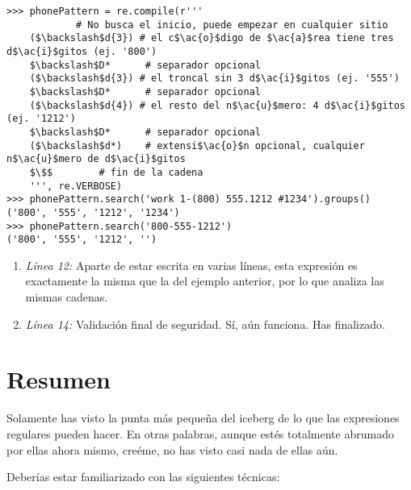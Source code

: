 \noindent\begin{minipage}{\textwidth}
\begin{lstlisting}[mathescape=True]
>>> phonePattern = re.compile(r'''
            # No busca el inicio, puede empezar en cualquier sitio
    ($\backslash$d{3}) # el c$\ac{o}$digo de $\ac{a}$rea tiene tres d$\ac{i}$gitos (ej. '800')
    $\backslash$D*      # separador opcional
    ($\backslash$d{3}) # el troncal sin 3 d$\ac{i}$gitos (ej. '555')
    $\backslash$D*      # separador opcional
    ($\backslash$d{4}) # el resto del n$\ac{u}$mero: 4 d$\ac{i}$gitos (ej. '1212')
    $\backslash$D*      # separador opcional
    ($\backslash$d*)    # extensi$\ac{o}$n opcional, cualquier n$\ac{u}$mero de d$\ac{i}$gitos
    $\$$        # fin de la cadena
    ''', re.VERBOSE)
>>> phonePattern.search('work 1-(800) 555.1212 #1234').groups()
('800', '555', '1212', '1234')
>>> phonePattern.search('800-555-1212')
('800', '555', '1212', '')
\end{lstlisting}
\end{minipage}

\begin{enumerate}

\item \emph{Línea 12:} Aparte de estar escrita en varias líneas, esta expresión es exactamente la misma que la del ejemplo anterior, por lo que analiza las mismas cadenas.

\item \emph{Línea 14:} Validación final de seguridad. Sí, aún funciona. Has finalizado.

\end{enumerate}

\section{Resumen}

Solamente has visto la punta más pequeña del iceberg de lo que las expresiones regulares pueden hacer. En otras palabras, aunque estés totalmente abrumado por ellas ahora mismo, creéme, no has visto casi nada de ellas aún.

Deberías estar familiarizado con las siguientes técnicas:


